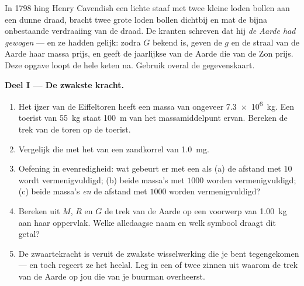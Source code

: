 \begin{problem}
\label{pb:g10:universal-gravitation:1}
In 1798 hing Henry Cavendish een lichte staaf met twee kleine loden
bollen aan een dunne draad, bracht twee grote loden bollen dichtbij en
mat de bijna onbestaande verdraaiing van de draad. De kranten schreven
dat hij \emph{de Aarde had gewogen} --- en ze hadden gelijk: zodra $G$
bekend is, geven de $g$ en de straal van de Aarde haar massa prijs, en
geeft de jaarlijkse  van de Aarde die van de Zon prijs. Deze opgave
loopt de hele keten na. Gebruik overal de gegevenskaart.

\medskip
\noindent\textbf{Deel I --- De zwakste kracht.}
\begin{enumerate}
  \item Het ijzer van de Eiffeltoren heeft een massa van ongeveer
        \qty{7.3e6}{kg}. Een toerist van \qty{55}{kg} staat \qty{100}{m}
        van het massamiddelpunt ervan. Bereken de trek van de toren op de
        toerist.
  \item Vergelijk die met het  van een zandkorrel van
        \qty{1.0}{mg}.
  \item Oefening in evenredigheid: wat gebeurt er met een
         als (a) de afstand met $10$ wordt
        vermenigvuldigd; (b) beide massa's met $1000$ worden
        vermenigvuldigd; (c) beide massa's \emph{en} de afstand met
        $1000$ worden vermenigvuldigd?
  \item Bereken uit $M$, $R$ en $G$ de trek van de Aarde op een voorwerp
        van \qty{1.00}{kg} aan haar oppervlak. Welke alledaagse naam en
        welk symbool draagt dit getal?
  \item De zwaartekracht is veruit de zwakste wisselwerking die je bent
        tegengekomen --- en toch regeert ze het heelal. Leg in een of
        twee zinnen uit waarom de trek van de Aarde op jou die van je
        buurman overheerst.
\end{enumerate}


\end{problem}
